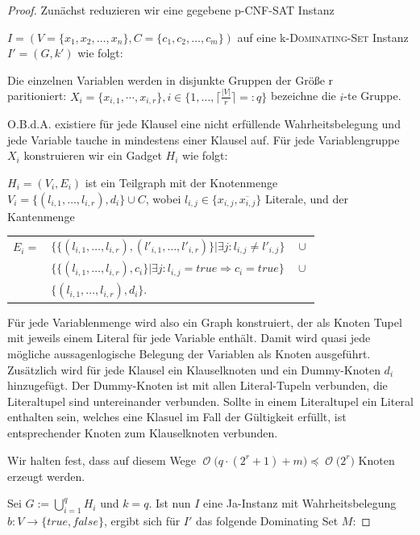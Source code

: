 \documentclass[a4paper,ngerman]{atseminar}
\newcommand{\BigO}[1]{\ensuremath{\operatorname{\mathcal{O}}\bigl(#1\bigr)}\xspace}
\begin{document}
\begin{proof}
  Zunächst reduzieren wir eine gegebene p-\textsc{CNF-SAT} Instanz

  \noindent
  $I = (V = \{x_1, x_2, \dots, x_n\}, C = \{c_1, c_2, \dots, c_m\})$ auf eine k-\textsc{Dominating-Set} Instanz $I' = (G, k')$ wie folgt:

  \noindent
  Die einzelnen Variablen werden in disjunkte Gruppen der Größe r \\paritioniert: $X_i = \{x_{i,1}, \cdots, x_{i,r}\}, i \in \{1, \dots, \lceil\frac{|V|}{r}\rceil =: q\}$
  bezeichne die $i$-te Gruppe.

  \noindent
  O.B.d.A. existiere für jede Klausel eine nicht erfüllende Wahrheitsbelegung und jede Variable tauche in mindestens einer Klausel auf.
  Für jede Variablengruppe $X_i$ konstruieren wir ein Gadget $H_i$ wie folgt:

  \noindent
  $H_i = (V_i, E_i)$ ist ein Teilgraph mit der Knotenmenge $V_i = \{(l_{i,1}, \dots, l_{i,r}), d_i\} \cup C$, wobei $l_{i,j} \in \{x_{i,j}, \overline{x_{i,j}}\}$ Literale,  
  und der Kantenmenge \\
  \begin{tabular}{ll}
    $E_i =$ & $\{\{(l_{i,1}, \dots, l_{i,r}), (l'_{i,1}, \dots, l'_{i,r})\} | \exists j: l_{i,j} \neq l'_{i,j} \} \quad \cup$ \\
            & $\{\{(l_{i,1}, \dots, l_{i,r}), c_i\} | \exists j: l_{i,j} = true \Rightarrow c_i = true\} \quad \cup$ \\
            & $\{(l_{i,1}, \dots, l_{i,r}), d_i\}$.
  \end{tabular}
 
   \noindent
  Für jede Variablenmenge wird also ein Graph konstruiert, der als Knoten Tupel mit jeweils einem Literal für jede Variable enthält. Damit wird
  quasi jede mögliche aussagenlogische Belegung der Variablen als Knoten ausgeführt. Zusätzlich wird für jede Klausel ein Klauselknoten
  und ein Dummy-Knoten $d_i$ hinzugefügt.
  Der Dummy-Knoten ist mit allen Literal-Tupeln verbunden, die Literaltupel sind untereinander verbunden.
  Sollte in einem Literaltupel ein Literal enthalten sein, welches eine Klasuel im Fall der Gültigkeit erfüllt, ist entsprechender Knoten zum Klauselknoten verbunden.

  \noindent
  Wir halten fest, dass auf diesem Wege $\BigO{q \cdot (2^r + 1) + m} \preceq \BigO{2^r}$ Knoten erzeugt werden.

  \noindent
  Sei $G := \bigcup_{i = 1}^{q}{H_i}$ und $k = q$.
  Ist nun $I$ eine Ja-Instanz mit Wahrheitsbelegung\\ $b: V \rightarrow \{true, false\}$, ergibt sich für $I'$ das folgende Dominating Set $M$:


\end{proof}
\end{document}
